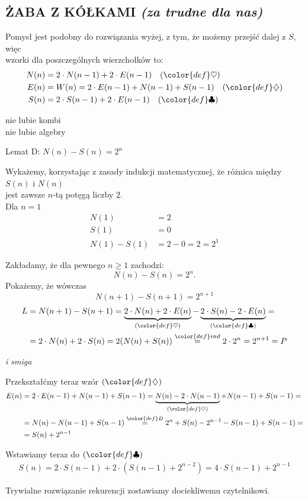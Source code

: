 \documentclass{article}
\begin{document}
\subsection*{\color{emp}ŻABA Z KÓŁKAMI \emph{\normalsize\color{txt}(za trudne dla nas)}}

Pomysł jest podobny do rozwiązania wyżej, z tym, że możemy przejść dalej z $S$, więc \\wzorki dla poszczególnych wierzchołków to:
\begin{align*}
    N(n) &= 2\cdot N(n-1) + 2\cdot E(n-1) \quad({\color{def}\heartsuit})\\
    E(n) &= W(n) = 2\cdot E(n-1) + N(n-1) + S(n-1)\quad ({\color{def}\diamondsuit})\\
    S(n) &= 2\cdot S(n-1) + 2\cdot E(n-1)\quad({\color{def}\clubsuit})
\end{align*}\bigskip

{\color{back}nie lubie kombi}\bigskip\\
{\color{back}nie lubie algebry}\bigskip\\

\begin{center}\large
    {\large\color{emp}Lemat {\color{def}D}:} $N(n)-S(n)=2^n$
\end{center}\medskip
Wykażemy, korzystając z zasady indukcji matematycznej, że różnica między $S(n)$ i $N(n)$ \\jest zawsze $n$-tą potęgą liczby 2.\medskip\\
Dla $n=1$
\begin{align*}
    N(1)&=2\\
    S(1)&=0\\
    N(1)-S(1)&=2-0=2=2^1
\end{align*}

Zakładamy, że dla pewnego $n\geq 1$ zachodzi:
$$N(n)-S(n)=2^n.$$
Pokażemy, że wówczas
$$N(n+1)-S(n+1)=2^{n+1}$$
\begin{align*}
    L&=N(n+1)-S(n+1)=\underbrace{2\cdot N(n)+2\cdot E(n)}_{({\color{def}\heartsuit})} -\underbrace{2\cdot S(n)-2\cdot E(n)}_{({\color{def}\clubsuit})}=\\
    &=2\cdot N(n) +2\cdot S(n) = 2(N(n)+S(n))\overset{{\color{def}ind}}=2\cdot 2^n=2^{n+1}=P
\end{align*}
\begin{flushright}\emph{\scriptsize\color{def}i smiga}\\\end{flushright}

Przekształćmy teraz wzór $({\color{def}\diamondsuit})$
\begin{align*}
    E(n) &= 2\cdot E(n-1)+N(n-1)+S(n-1)= \underbrace{N(n)-2\cdot N(n-1)}_{({\color{def}\heartsuit})}+N(n-1)+S(n-1)=\\
    &=N(n)-N(n-1)+S(n-1) \overset{{\color{def}D}}= 2^{n} + S(n) - 2^{n-1}-S(n-1)+S(n-1)=\\
    &=S(n)+2^{n-1}
\end{align*}

Wstawiamy teraz do $({\color{def}\clubsuit})$
\begin{align*}
    S(n) = 2\cdot S(n-1) + 2\cdot (S(n-1) + 2^{n-2}) = 4\cdot S(n-1) + 2^{n-1}
\end{align*}

Trywialne rozwiązanie rekurencji zostawiamy dociekliwemu czytelnikowi.
\kondow
\end{document}
